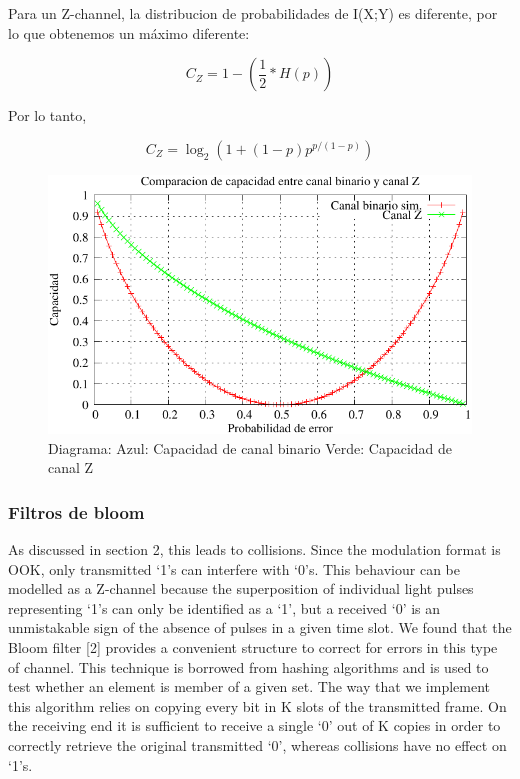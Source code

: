\documentclass[12pt,twoside,openright]{moddalthesis}
\begin{document}
Para un Z-channel, la distribucion de probabilidades de I(X;Y) es diferente, por lo que obtenemos un máximo diferente:

$$ C_{Z} = 1 - \left(\frac{1}{2}*H(p)\right) $$ \cite{tallini}

Por lo tanto,

$$ C_{Z} = \log_2\left(1+(1-p) p^{p/(1-p)}\right) $$


\begin{figure}[th]
  \begin{center}
    \includegraphics[scale=0.9]{capacidad/comparacionBZ}
  \end{center}
  \caption{Diagrama: Azul: Capacidad de canal binario Verde: Capacidad de canal Z}
  \label{fig:CompBZ}
\end{figure}


\subsubsection{Filtros de bloom}
As discussed in section 2, this leads to collisions. Since the modulation format is OOK, only transmitted ‘1’s can interfere with ‘0’s.
This behaviour can be modelled as a Z-channel because the superposition of individual light pulses representing ‘1’s
can only be identified as a ‘1’, but a received ‘0’ is an unmistakable sign of the absence of pulses in a given time slot.
We found that the Bloom filter [2] provides a convenient structure to correct for errors in this type of channel. This
technique is borrowed from hashing algorithms and is used to test whether an element is member of a given set. The
way that we implement this algorithm relies on copying every bit in K slots of the transmitted frame. On the receiving
end it is sufficient to receive a single ‘0’ out of K copies in order to correctly retrieve the original transmitted ‘0’,
whereas collisions have no effect on ‘1’s.
\end{document}
